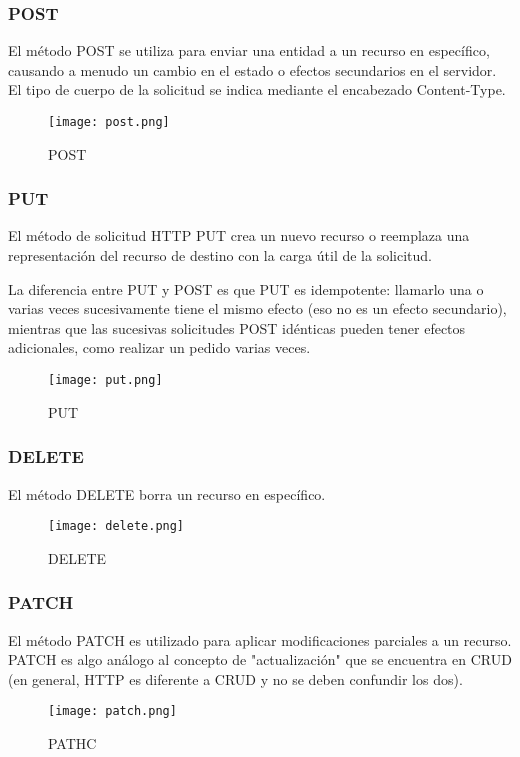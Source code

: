 \subsubsection{POST}
El método POST se utiliza para enviar una entidad a un recurso en específico, causando a menudo un cambio en el estado o efectos secundarios en el servidor. \\
El tipo de cuerpo de la solicitud se indica mediante el encabezado Content-Type.

\begin{figure}[H]
	\center
	\texttt{[image: post.png]}
	\caption{POST}
	\label{fig:super}
\end{figure}

\subsubsection{PUT}
El método de solicitud HTTP PUT crea un nuevo recurso o reemplaza una representación del recurso de destino con la carga útil de la solicitud.

La diferencia entre PUT y POST es que PUT es idempotente: llamarlo una o varias veces sucesivamente tiene el mismo efecto (eso no es un efecto secundario), mientras que las sucesivas solicitudes POST idénticas pueden tener efectos adicionales, como realizar un pedido varias veces.
\begin{figure}[H]
	\center
	\texttt{[image: put.png]}
	\caption{PUT}
	\label{fig:super}
\end{figure}

\subsubsection{DELETE}
El método DELETE borra un recurso en específico.
\begin{figure}[H]
	\center
	\texttt{[image: delete.png]}
	\caption{DELETE}
	\label{fig:super}
\end{figure}

\subsubsection{PATCH}
El método PATCH  es utilizado para aplicar modificaciones parciales a un recurso.\\
PATCH es algo análogo al concepto de "actualización" que se encuentra en CRUD (en general, HTTP es diferente a CRUD y no se deben confundir los dos).
\begin{figure}[H]
	\center
	\texttt{[image: patch.png]}
	\caption{PATHC}
	\label{fig:super}
\end{figure}


